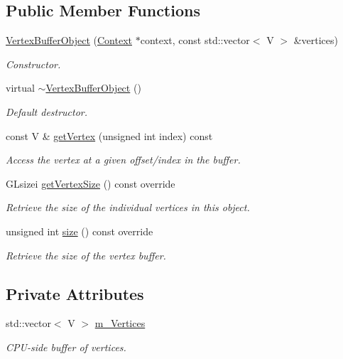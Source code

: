 \subsection*{Public Member Functions}
\begin{DoxyCompactItemize}
\item 
\hyperlink{class_vertex_buffer_object_ac6b700895db0b5f7aaee6e17f6b0db13}{Vertex\+Buffer\+Object} (\hyperlink{class_context}{Context} $\ast$context, const std\+::vector$<$ V $>$ \&vertices)
\begin{DoxyCompactList}\small\item\em Constructor. \end{DoxyCompactList}\item 
virtual \hyperlink{class_vertex_buffer_object_a196fb9f8c90cff926f4bda372b71f23b}{$\sim$\+Vertex\+Buffer\+Object} ()
\begin{DoxyCompactList}\small\item\em Default destructor. \end{DoxyCompactList}\item 
const V \& \hyperlink{class_vertex_buffer_object_a166710d3d7526c9bfb7f99de1b8057a4}{get\+Vertex} (unsigned int index) const 
\begin{DoxyCompactList}\small\item\em Access the vertex at a given offset/index in the buffer. \end{DoxyCompactList}\item 
G\+Lsizei \hyperlink{class_vertex_buffer_object_ab31e996068d871acaa6bb6b5117dd2c3}{get\+Vertex\+Size} () const  override
\begin{DoxyCompactList}\small\item\em Retrieve the size of the individual vertices in this object. \end{DoxyCompactList}\item 
unsigned int \hyperlink{class_vertex_buffer_object_a9c6c36c1711d4fd1d1aae6916c35c9db}{size} () const  override
\begin{DoxyCompactList}\small\item\em Retrieve the size of the vertex buffer. \end{DoxyCompactList}\end{DoxyCompactItemize}
\subsection*{Private Attributes}
\begin{DoxyCompactItemize}
\item 
std\+::vector$<$ V $>$ \hyperlink{class_vertex_buffer_object_aa8ccd2ec2c067c5fff5bb2dded70fcc6}{m\+\_\+\+Vertices}
\begin{DoxyCompactList}\small\item\em C\+P\+U-\/side buffer of vertices. \end{DoxyCompactList}\end{DoxyCompactItemize}



